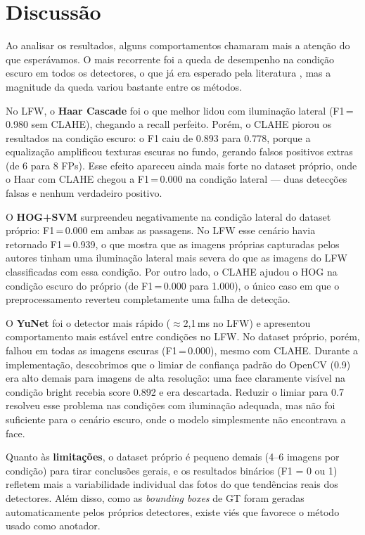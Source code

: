 \documentclass[conference]{IEEEtran}
\begin{document}
\section{Discuss\~ao}

Ao analisar os resultados, alguns comportamentos chamaram mais a aten\c{c}\~ao do que esper\'avamos. O mais recorrente foi a queda de desempenho na condi\c{c}\~ao escuro em todos os detectores, o que j\'a era esperado pela literatura \cite{Adini1997}, mas a magnitude da queda variou bastante entre os m\'etodos.

No LFW, o \textbf{Haar Cascade} foi o que melhor lidou com ilumina\c{c}\~ao lateral (F1\,=\,0.980 sem CLAHE), chegando a recall perfeito. Por\'em, o CLAHE piorou os resultados na condi\c{c}\~ao escuro: o F1 caiu de 0.893 para 0.778, porque a equaliza\c{c}\~ao amplificou texturas escuras no fundo, gerando falsos positivos extras (de 6 para 8 FPs). Esse efeito apareceu ainda mais forte no dataset pr\'oprio, onde o Haar com CLAHE chegou a F1\,=\,0.000 na condi\c{c}\~ao lateral --- duas detec\c{c}\~oes falsas e nenhum verdadeiro positivo.

O \textbf{HOG+SVM} surpreendeu negativamente na condi\c{c}\~ao lateral do dataset pr\'oprio: F1\,=\,0.000 em ambas as passagens. No LFW esse cen\'ario havia retornado F1\,=\,0.939, o que mostra que as imagens pr\'oprias capturadas pelos autores tinham uma ilumina\c{c}\~ao lateral mais severa do que as imagens do LFW classificadas com essa condi\c{c}\~ao. Por outro lado, o CLAHE ajudou o HOG na condi\c{c}\~ao escuro do pr\'oprio (de F1\,=\,0.000 para 1.000), o \'unico caso em que o preprocessamento reverteu completamente uma falha de detec\c{c}\~ao.

O \textbf{YuNet} foi o detector mais r\'apido ($\approx$2,1\,ms no LFW) e apresentou comportamento mais est\'avel entre condi\c{c}\~oes no LFW. No dataset pr\'oprio, por\'em, falhou em todas as imagens escuras (F1\,=\,0.000), mesmo com CLAHE. Durante a implementa\c{c}\~ao, descobrimos que o limiar de confian\c{c}a padr\~ao do OpenCV (0.9) era alto demais para imagens de alta resolu\c{c}\~ao: uma face claramente vis\'ivel na condi\c{c}\~ao bright recebia score 0.892 e era descartada. Reduzir o limiar para 0.7 resolveu esse problema nas condi\c{c}\~oes com ilumina\c{c}\~ao adequada, mas n\~ao foi suficiente para o cen\'ario escuro, onde o modelo simplesmente n\~ao encontrava a face.

Quanto \`as \textbf{limita\c{c}\~oes}, o dataset pr\'oprio \'e pequeno demais (4--6 imagens por condi\c{c}\~ao) para tirar conclus\~oes gerais, e os resultados bin\'arios (F1 = 0 ou 1) refletem mais a variabilidade individual das fotos do que tend\^encias reais dos detectores. Al\'em disso, como as \textit{bounding boxes} de GT foram geradas automaticamente pelos pr\'oprios detectores, existe vi\'es que favorece o m\'etodo usado como anotador.
\end{document}
